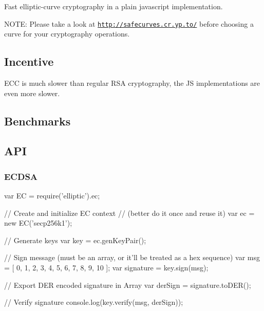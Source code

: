 Fast elliptic-\/curve cryptography in a plain javascript implementation.

N\+O\+TE\+: Please take a look at \href{http://safecurves.cr.yp.to/}{\tt http\+://safecurves.\+cr.\+yp.\+to/} before choosing a curve for your cryptography operations.

\subsection*{Incentive}

E\+CC is much slower than regular R\+SA cryptography, the JS implementations are even more slower.

\subsection*{Benchmarks}




\subsection*{A\+PI}

\subsubsection*{E\+C\+D\+SA}


\begin{DoxyCode}
var EC = require('elliptic').ec;

// Create and initialize EC context
// (better do it once and reuse it)
var ec = new EC('secp256k1');

// Generate keys
var key = ec.genKeyPair();

// Sign message (must be an array, or it'll be treated as a hex sequence)
var msg = [ 0, 1, 2, 3, 4, 5, 6, 7, 8, 9, 10 ];
var signature = key.sign(msg);

// Export DER encoded signature in Array
var derSign = signature.toDER();

// Verify signature
console.log(key.verify(msg, derSign));
\end{DoxyCode}


